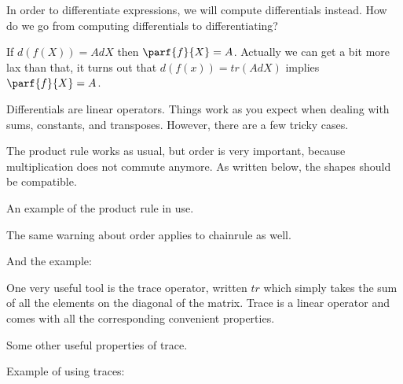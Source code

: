 \documentclass[12pt]{article}
\begin{document}

In order to differentiate expressions, we will compute differentials instead. How do we go from computing differentials to differentiating?

If $d(f(X)) = AdX$ then $\parf{f}{X} = A$. Actually we can get a bit more lax than that, it turns out that $d(f(x)) = tr(AdX)$ implies $\parf{f}{X} = A$. 

Differentials are linear operators. Things work as you expect when dealing with sums, constants, and transposes. However, there are a few tricky cases.

The product rule works as usual, but order is very important, because multiplication does not commute anymore. As written below, the shapes should be compatible. 

An example of the product rule in use.


The same warning about order applies to chainrule as well.

And the example:


One very useful tool is the trace operator, written $tr$ which simply takes the sum of all the elements on the diagonal of the matrix. Trace is a linear operator and comes with all the corresponding convenient properties. 

Some other useful properties of trace.


Example of using traces:
\end{document}
